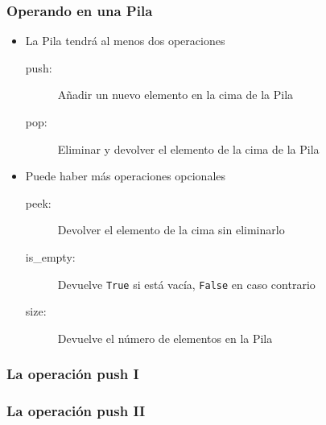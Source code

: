 \documentclass[11pt]{beamer}
\begin{document}
\begin{frame}\frametitle{Operando en una Pila}
\begin{itemize}
\item La Pila tendrá al menos dos operaciones
    \begin{description}
    \item[push:] Añadir un nuevo elemento en la cima de la Pila
    \item[pop:] Eliminar y devolver el elemento de la cima de la Pila
    \end{description}
\item Puede haber más operaciones opcionales
    \begin{description}
    \item[peek:] Devolver el elemento de la cima sin eliminarlo
    \item[is\_empty:] Devuelve \lstinline|True| si está vacía, \lstinline|False| en caso contrario
    \item[size:] Devuelve el número de elementos en la Pila
    \end{description}
\end{itemize}
\end{frame}

\begin{frame}\frametitle{La operación push I}
\begin{center}
\end{center}
\end{frame}

\begin{frame}\frametitle{La operación push II}
\begin{center}
\end{center}
\end{frame}
\end{document}
